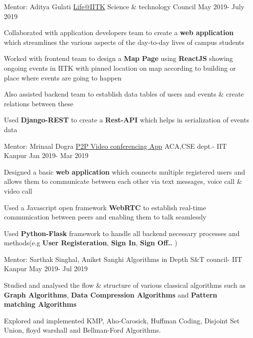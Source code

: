 \begin{cventries}
  \cventry
    {Mentor: Aditya Gulati}
    {\href{https://github.com/life-iitk}{Life@IITK}}
    {Science \& technology Council}
    {May 2019- July 2019}
    {
      \begin{cvitems}
        \item {Collaborated with application developers team to create a \textbf{web application} which streamlines the various aspects of the day-to-day lives of campus students}
        \item {Worked with frontend team to design a \textbf{Map Page} using \textbf{ReactJS} showing ongoing events in IITK with pinned location on map according to building or place where events are going to happen}
        \item Also assisted backend team to establish data tables of users and events \& create relations between these
        \item {Used \textbf{Django-REST} to create a \textbf{Rest-API} which helps in serialization of events data}
      \end{cvitems}
    }

    \cventry
    {Mentor: Mrinaal Dogra}
    {\href{https://github.com/RohitRanjangit/P2P-video-conferencing-app}{P2P Video conferencing App}}
    {ACA,CSE dept.- IIT Kanpur}
    {Jan 2019- Mar 2019}
    {
      \begin{cvitems}
        \item Designed a basic \textbf{web application} which connects multiple registered users and allows them to communicate between each other via text messages, voice call \& video call
        \item Used a Javascript open framework \textbf{WebRTC} to establish real-time communication between peers and enabling them to talk seamlessly
        \item Used \textbf{Python-Flask} framework to handle all backend necessary processes and methods(e.g \textbf{User Registeration},\textbf{ Sign
        In}, \textbf{Sign Off..} )
      \end{cvitems}
    } 
	 \cventry
	{Mentor: Sarthak Singhal, Aniket Sanghi}
	{Algorithms in Depth}
	{S\&T council- IIT Kanpur}
	{May 2019- Jul 2019}
	{
		\begin{cvitems}
			\item Studied and analysed the flow \& structure of various classical algorithms such as \textbf{Graph Algorithms}, \textbf{Data Compression Algorithms} and \textbf{Pattern matching Algorithms}
			\item Explored and implemented KMP, Aho-Carosick, Huffman Coding, Disjoint Set Union, floyd warshall and Bellman-Ford Algorithms.
		\end{cvitems}
	} 


\end{cventries}
